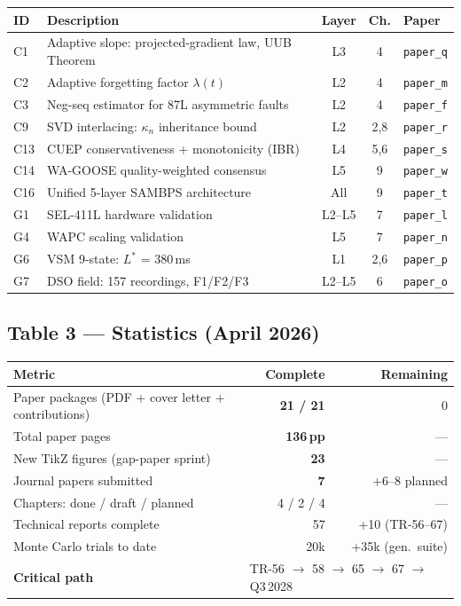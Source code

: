\documentclass[11pt,a4paper]{article}
\begin{document}
{\small\begin{tabular}{lp{5.2cm}ccp{3.5cm}}
\toprule
ID & Description & Layer & Ch. & Paper \\
\midrule
\rowcolor{L3col!10}
C1 & Adaptive slope: projected-gradient law, UUB Theorem & L3 & 4 & \texttt{paper\_q} \\
\rowcolor{L2col!10}
C2 & Adaptive forgetting factor $\lambda(t)$ & L2 & 4 & \texttt{paper\_m} \\
\rowcolor{L2col!10}
C3 & Neg-seq estimator for 87L asymmetric faults & L2 & 4 & \texttt{paper\_f} \\
\rowcolor{L2col!10}
C9 & SVD interlacing: $\kappa_n$ inheritance bound & L2 & 2,8 & \texttt{paper\_r} \\
\rowcolor{L4col!10}
C13 & CUEP conservativeness + monotonicity (IBR) & L4 & 5,6 & \texttt{paper\_s} \\
\rowcolor{L5col!10}
C14 & WA-GOOSE quality-weighted consensus & L5 & 9 & \texttt{paper\_w} \\
\rowcolor{L5col!10}
C16 & Unified 5-layer SAMBPS architecture & All & 9 & \texttt{paper\_t} \\
G1 & SEL-411L hardware validation & L2--L5 & 7 & \texttt{paper\_l} \\
G4 & WAPC scaling validation & L5 & 7 & \texttt{paper\_n} \\
G6 & VSM 9-state: $L^*$ = 380\,ms & L1 & 2,6 & \texttt{paper\_p} \\
G7 & DSO field: 157 recordings, F1/F2/F3 & L2--L5 & 6 & \texttt{paper\_o} \\
\bottomrule
\end{tabular}}

\vspace{6pt}
\subsection*{Table 3 — Statistics (April 2026)}

{\small\begin{tabular}{lrr}
\toprule
Metric & Complete & Remaining \\
\midrule
Paper packages (PDF + cover letter + contributions) & \textbf{21 / 21} & 0 \\
Total paper pages & \textbf{136\,pp} & --- \\
New TikZ figures (gap-paper sprint) & \textbf{23} & --- \\
Journal papers submitted & \textbf{7} & +6--8 planned \\
Chapters: done / draft / planned & 4 / 2 / 4 & --- \\
Technical reports complete & 57 & +10 (TR-56--67) \\
Monte Carlo trials to date & 20k & +35k (gen.\ suite) \\
\midrule
\textbf{Critical path} & \multicolumn{2}{l}{TR-56 $\to$ 58 $\to$ 65 $\to$ 67 $\to$ Q3\,2028} \\
\bottomrule
\end{tabular}}
\end{document}
